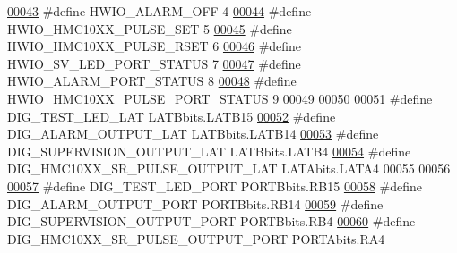 \begin{DoxyCode}
\hypertarget{a00058_source_l00043}{}\hyperlink{a00058_a17401c2732dee3a19b55a210870b6d8d}{00043} \textcolor{preprocessor}{#define         HWIO\_ALARM\_OFF                              4}
\hypertarget{a00058_source_l00044}{}\hyperlink{a00058_a6e93f09b80c1e730d60fbce52cc29818}{00044} \textcolor{preprocessor}{#define         HWIO\_HMC10XX\_PULSE\_SET                      5}
\hypertarget{a00058_source_l00045}{}\hyperlink{a00058_ac5506797b126d9ef0f4495c899fb6ef6}{00045} \textcolor{preprocessor}{#define         HWIO\_HMC10XX\_PULSE\_RSET                     6}
\hypertarget{a00058_source_l00046}{}\hyperlink{a00058_ab1278d6ffe9c661f55b9f146f82b0be6}{00046} \textcolor{preprocessor}{#define         HWIO\_SV\_LED\_PORT\_STATUS                     7}
\hypertarget{a00058_source_l00047}{}\hyperlink{a00058_a584ae44c8dda691dd116f96dd76ccf84}{00047} \textcolor{preprocessor}{#define         HWIO\_ALARM\_PORT\_STATUS                      8}
\hypertarget{a00058_source_l00048}{}\hyperlink{a00058_ad1bba8a70503545d912de4334f47100c}{00048} \textcolor{preprocessor}{#define         HWIO\_HMC10XX\_PULSE\_PORT\_STATUS              9}
00049 
00050 
\hypertarget{a00058_source_l00051}{}\hyperlink{a00058_a4c044f78fb8b7ee19bfdb5d2b204b50e}{00051} \textcolor{preprocessor}{#define         DIG\_TEST\_LED\_LAT                        LATBbits.LATB15}
\hypertarget{a00058_source_l00052}{}\hyperlink{a00058_adfa16e4e30e94462911794696252b2e2}{00052} \textcolor{preprocessor}{#define         DIG\_ALARM\_OUTPUT\_LAT                    LATBbits.LATB14}
\hypertarget{a00058_source_l00053}{}\hyperlink{a00058_af90b9b01c8dc72faf22ed4f02d849cc8}{00053} \textcolor{preprocessor}{#define         DIG\_SUPERVISION\_OUTPUT\_LAT              LATBbits.LATB4}
\hypertarget{a00058_source_l00054}{}\hyperlink{a00058_a257acf5e9bb0074bec6115ff3df89251}{00054} \textcolor{preprocessor}{#define         DIG\_HMC10XX\_SR\_PULSE\_OUTPUT\_LAT             LATAbits.LATA4}
00055 
00056 
\hypertarget{a00058_source_l00057}{}\hyperlink{a00058_a4c186ff7c22309dad906674fb20c72a2}{00057} \textcolor{preprocessor}{#define         DIG\_TEST\_LED\_PORT                       PORTBbits.RB15}
\hypertarget{a00058_source_l00058}{}\hyperlink{a00058_a740480cf500e2856ac89753c9fbf0b5b}{00058} \textcolor{preprocessor}{#define         DIG\_ALARM\_OUTPUT\_PORT                   PORTBbits.RB14}
\hypertarget{a00058_source_l00059}{}\hyperlink{a00058_aa8b76bdd2ed9a9654ad4a311ca6f6064}{00059} \textcolor{preprocessor}{#define         DIG\_SUPERVISION\_OUTPUT\_PORT             PORTBbits.RB4}
\hypertarget{a00058_source_l00060}{}\hyperlink{a00058_a4215a1b2a84b3308c07e27cebe0a1ea5}{00060} \textcolor{preprocessor}{#define         DIG\_HMC10XX\_SR\_PULSE\_OUTPUT\_PORT            PORTAbits.RA4}

\end{DoxyCode}
